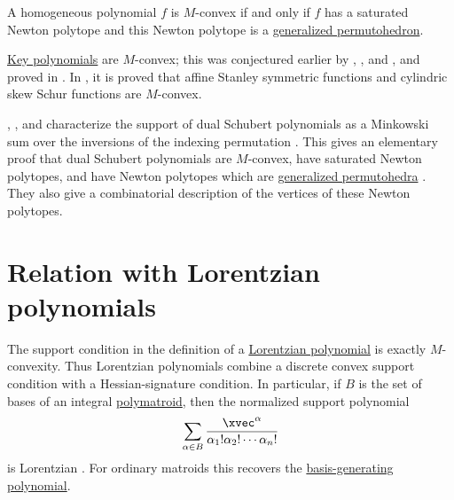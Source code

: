 \begin{theorem}
A homogeneous polynomial $f$ is $M$-convex if and only if $f$ has a saturated
Newton polytope and this Newton polytope is a
\hyperref[generalizedPermutohedron]{generalized permutohedron}.
\end{theorem}

\hyperref[key]{Key polynomials} are $M$-convex; this was conjectured earlier by
, , and 
\cite{MonicalTokcanYong2019}, and proved in \cite{FanGuoPengSun2020}.
In \cite{WangZhangZhang2024x}, it is proved that affine Stanley symmetric
functions and cylindric skew Schur functions are $M$-convex.

, , and 
characterize the support of dual Schubert polynomials as a Minkowski sum over
the inversions of the indexing permutation \cite[Thm.~1.2]{AnTungZhang2024x}.
This gives an elementary proof that dual Schubert polynomials are
$M$-convex, have saturated Newton polytopes, and have Newton polytopes which
are \hyperref[generalizedPermutohedron]{generalized permutohedra}
\cite[Cor.~1.3]{AnTungZhang2024x}.  They also give a combinatorial
description of the vertices of these Newton polytopes.


\section[newtonLorentzianBridge]{Relation with Lorentzian polynomials}

The support condition in the definition of a
\hyperref[lorentzianPolynomial]{Lorentzian polynomial} is exactly
$M$-convexity.  Thus Lorentzian polynomials combine a discrete convex support
condition with a Hessian-signature condition.  In particular, if $B$ is the set
of bases of an integral \hyperref[polymatroids]{polymatroid}, then the
normalized support polynomial
\[
  \sum_{\alpha\in B}
  \frac{\xvec^\alpha}{\alpha_1!\alpha_2!\dotsm\alpha_n!}
\]
is Lorentzian \cite{BrandenHuh2020}.  For ordinary matroids this recovers the
\hyperref[basisGeneratingPolynomial]{basis-generating polynomial}.
